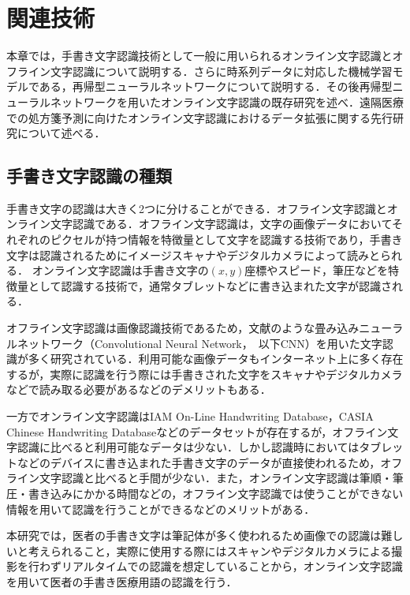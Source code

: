 
\chapter{関連技術}
\label{cha:relate}
本章では，手書き文字認識技術として一般に用いられるオンライン文字認識とオフライン文字認識について説明する．さらに時系列データに対応した機械学習モデルである，再帰型ニューラルネットワークについて説明する．その後再帰型ニューラルネットワークを用いたオンライン文字認識の既存研究を述べ．遠隔医療での処方箋予測に向けたオンライン文字認識におけるデータ拡張に関する先行研究について述べる．

\section{手書き文字認識の種類}
\label{sec:rel_1}
手書き文字の認識は大きく2つに分けることができる．オフライン文字認識とオンライン文字認識である．オフライン文字認識は，文字の画像データにおいてそれぞれのピクセルが持つ情報を特徴量として文字を認識する技術であり，手書き文字は認識されるためにイメージスキャナやデジタルカメラによって読みとられる．
オンライン文字認識は手書き文字の$(x, y)$座標やスピード，筆圧などを特徴量として認識する技術で，通常タブレットなどに書き込まれた文字が認識される．

オフライン文字認識は画像認識技術であるため，文献\cite{yuan12:offline}のような畳み込みニューラルネットワーク（Convolutional Neural Network，　以下CNN）を用いた文字認識が多く研究されている．利用可能な画像データもインターネット上に多く存在するが，実際に認識を行う際には手書きされた文字をスキャナやデジタルカメラなどで読み取る必要があるなどのデメリットもある．

一方でオンライン文字認識はIAM On-Line Handwriting Database\cite{iam}，CASIA Chinese Handwriting Database\cite{liu11:casia}などのデータセットが存在するが，オフライン文字認識に比べると利用可能なデータは少ない．しかし認識時においてはタブレットなどのデバイスに書き込まれた手書き文字のデータが直接使われるため，オフライン文字認識と比べると手間が少ない．また，オンライン文字認識は筆順・筆圧・書き込みにかかる時間などの，オフライン文字認識では使うことができない情報を用いて認識を行うことができるなどのメリットがある．

本研究では，医者の手書き文字は筆記体が多く使われるため画像での認識は難しいと考えられること，実際に使用する際にはスキャンやデジタルカメラによる撮影を行わずリアルタイムでの認識を想定していることから，オンライン文字認識を用いて医者の手書き医療用語の認識を行う．


